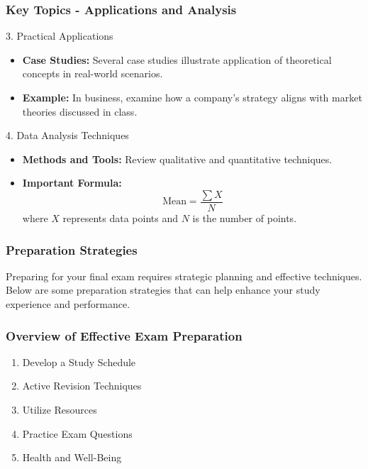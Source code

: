 \documentclass{beamer}
\begin{document}
\begin{frame}[fragile]
    \frametitle{Key Topics - Applications and Analysis}
    \begin{block}{3. Practical Applications}
        \begin{itemize}
            \item \textbf{Case Studies:} Several case studies illustrate application of theoretical concepts in real-world scenarios.
        \end{itemize}
        \begin{itemize}
            \item \textbf{Example:} In business, examine how a company's strategy aligns with market theories discussed in class.
        \end{itemize}
    \end{block}

    \begin{block}{4. Data Analysis Techniques}
        \begin{itemize}
            \item \textbf{Methods and Tools:} Review qualitative and quantitative techniques.
            \item \textbf{Important Formula:} 
            \begin{equation}
            \text{Mean} = \frac{\sum X}{N}
            \end{equation}
            where \( X \) represents data points and \( N \) is the number of points.
        \end{itemize}
    \end{block}
\end{frame}

\begin{frame}[fragile]
    \frametitle{Preparation Strategies}
    Preparing for your final exam requires strategic planning and effective techniques. Below are some preparation strategies that can help enhance your study experience and performance.
\end{frame}

\begin{frame}[fragile]
    \frametitle{Overview of Effective Exam Preparation}
    \begin{enumerate}
        \item Develop a Study Schedule
        \item Active Revision Techniques
        \item Utilize Resources
        \item Practice Exam Questions
        \item Health and Well-Being
    \end{enumerate}
\end{frame}
\end{document}
